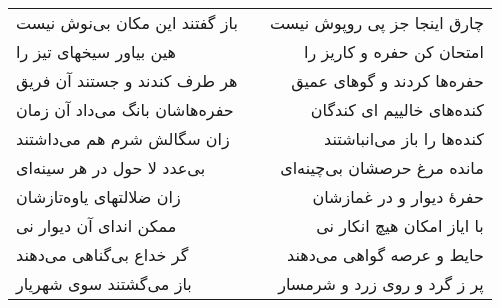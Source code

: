 \begin{center}
\begin{longtable}{l p{0.5cm} r}
باز گفتند این مکان بی‌نوش نیست
&&
چارق اینجا جز پی روپوش نیست
\\
هین بیاور سیخهای تیز را
&&
امتحان کن حفره و کاریز را
\\
هر طرف کندند و جستند آن فریق
&&
حفره‌ها کردند و گوهای عمیق
\\
حفره‌هاشان بانگ می‌داد آن زمان
&&
کنده‌های خالییم ای کندگان
\\
زان سگالش شرم هم می‌داشتند
&&
کنده‌ها را باز می‌انباشتند
\\
بی‌عدد لا حول در هر سینه‌ای
&&
مانده مرغ حرصشان بی‌چینه‌ای
\\
زان ضلالتهای یاوه‌تازشان
&&
حفرهٔ دیوار و در غمازشان
\\
ممکن اندای آن دیوار نی
&&
با ایاز امکان هیچ انکار نی
\\
گر خداع بی‌گناهی می‌دهند
&&
حایط و عرصه گواهی می‌دهند
\\
باز می‌گشتند سوی شهریار
&&
پر ز گرد و روی زرد و شرمسار
\\
\end{longtable}
\end{center}
